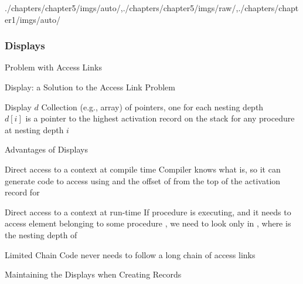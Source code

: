 \begin{graphicspathcontext}{{./chapters/chapter5/imgs/auto/},{./chapters/chapter5/imgs/raw/},{./chapters/chapter1/imgs/auto/}}
\begin{bibunit}[apalike]
\subsubsection{Displays}
\subsubsectiontableofcontentslide

\begin{frame}{Problem with Access Links}
	\begin{Large}
	\end{Large}
\end{frame}

\begin{frame}{Display: a Solution to the Access Link Problem}
	\vspace{1cm}
	\begin{definitionblock}{Display $d$}
		Collection (e.g., array) of pointers, one for each nesting depth \\[.25cm]
		$d[i]$ is a pointer to the highest activation record on the stack for any procedure at nesting depth $i$
	\end{definitionblock}
\end{frame}

\begin{frame}[background=6]{Advantages of Displays}
	\begin{block}{Direct access to a context at compile time}
		Compiler knows what  is, so it can generate code to access  using  and the offset of  from the top of the activation record for 
	\end{block}
	\vspace{.25cm}
	\begin{block}{Direct access to a context at run-time}
		If procedure  is executing, and it needs to access element  belonging to some procedure , we need to look only in , where  is the nesting depth of 
	\end{block}
	\vspace{.25cm}
	\begin{block}{Limited Chain}
		Code never needs to follow a long chain of access links
	\end{block}
\end{frame}

\begin{frame}{Maintaining the Displays when Creating Records}
	\begin{myalgorithm}
	\end{myalgorithm}
\end{frame}


\end{bibunit}
\end{graphicspathcontext}
